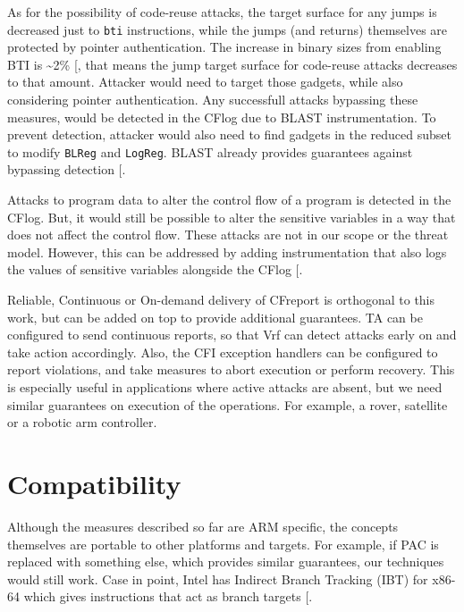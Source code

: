 \documentclass[a4paper, nobind]{templates/ociamthesis}
\begin{document}
As for the possibility of code-reuse attacks, the target surface for any jumps is
decreased just to \texttt{bti} instructions, while the jumps (and returns) themselves are
protected by pointer authentication. The increase in binary sizes from enabling BTI is \textasciitilde2\% {[}\citeproc{ref-arm-pacbti}{9}{]},
that means the jump target surface for code-reuse attacks decreases to that amount.
Attacker would need to target those gadgets, while also considering
pointer authentication. Any successfull attacks bypassing these measures, would
be detected in the CFlog due to BLAST instrumentation. To prevent detection,
attacker would also need to find gadgets in the reduced subset to modify \texttt{BLReg} and \texttt{LogReg}.
BLAST already provides guarantees against bypassing detection {[}\citeproc{ref-blast}{56}{]}.

Attacks to program data to alter the control flow of a program is detected in the CFlog.
But, it would still be possible to alter the sensitive variables in a way that
does not affect the control flow. These attacks are not in our scope or the threat model.
However, this can be addressed by adding instrumentation that also logs the values
of sensitive variables alongside the CFlog {[}\citeproc{ref-sun2020oat}{53}{]}.

Reliable, Continuous or On-demand delivery of CFreport is orthogonal to this work, but can
be added on top to provide additional guarantees. TA can be configured to send
continuous reports, so that Vrf can detect attacks early on and take action accordingly.
Also, the CFI exception handlers can be configured to report violations, and take
measures to abort execution or perform recovery. This is especially useful
in applications where active attacks are absent, but we need similar guarantees on
execution of the operations. For example, a rover, satellite or a robotic arm controller.

\section{Compatibility}\label{compatibility}

Although the measures described so far are ARM specific, the concepts themselves
are portable to other platforms and targets.
For example, if PAC is replaced with something else, which provides similar
guarantees, our techniques would still work. Case in point, Intel has Indirect
Branch Tracking (IBT) for x86-64 which gives instructions that act as branch targets {[}\citeproc{ref-intel-ibt}{32}{]}.
\end{document}
